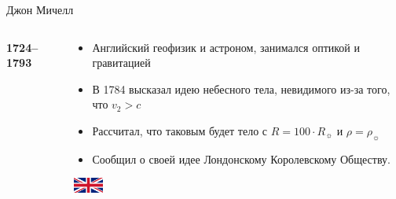\documentclass[usenames,dvipsnames,pdftex,unicode,hidelinks]{beamer}
\begin{document}
\begin{frame}{Джон Мичелл}
\begin{columns}[t]
\begin{column}{0.25\textwidth}
\begin{center}
          \textbf{1724--1793}
        \end{center}
      \end{column}
      \begin{column}{0.75\textwidth}
        \begin{itemize}
          \item<1-> Английский геофизик и астроном, занимался оптикой и гравитацией
          \item<2-> В \alert{1784} высказал идею небесного тела, невидимого из-за того, что $v_2 > c$
          \item<3-> Рассчитал, что таковым будет тело с $R = 100\cdot R_{\sun}$ и $\rho = \rho_{\sun}$
          \item<4-> Сообщил о своей идее Лондонскому Королевскому Обществу.
        \end{itemize}
        \begin{center}
          \vspace{5mm}
          \includegraphics[width=1cm]{britain}
        \end{center}
      \end{column}
    \end{columns}
  \end{frame}
    
\end{document}
